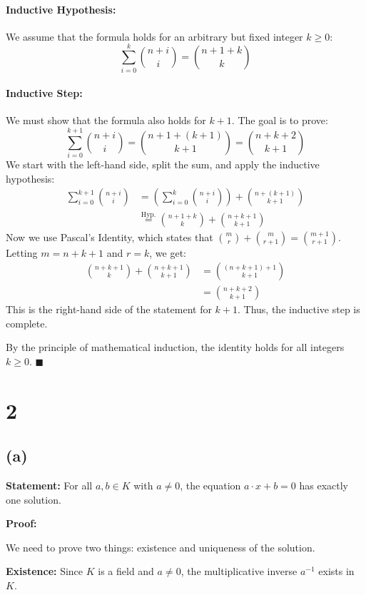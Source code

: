 \documentclass[12pt,a4paper]{article}
\theoremstyle{definition}
\theoremstyle{remark}
\begin{document}
\paragraph{Inductive Hypothesis:} We assume that the formula holds for an arbitrary but fixed integer $k \ge 0$:
\[
\sum_{i=0}^{k} \binom{n+i}{i} = \binom{n+1+k}{k}
\]

\paragraph{Inductive Step:} We must show that the formula also holds for $k+1$. The goal is to prove:
\[
\sum_{i=0}^{k+1} \binom{n+i}{i} = \binom{n+1+(k+1)}{k+1} = \binom{n+k+2}{k+1}
\]
We start with the left-hand side, split the sum, and apply the inductive hypothesis:
\begin{align*}
\sum_{i=0}^{k+1} \binom{n+i}{i} &= \left( \sum_{i=0}^{k} \binom{n+i}{i} \right) + \binom{n+(k+1)}{k+1} \\
&\overset{\text{Hyp.}}{=} \binom{n+1+k}{k} + \binom{n+k+1}{k+1}
\end{align*}
Now we use Pascal's Identity, which states that $\binom{m}{r} + \binom{m}{r+1} = \binom{m+1}{r+1}$.
Letting $m=n+k+1$ and $r=k$, we get:
\begin{align*}
\binom{n+k+1}{k} + \binom{n+k+1}{k+1} &= \binom{(n+k+1)+1}{k+1} \\
&= \binom{n+k+2}{k+1}
\end{align*}
This is the right-hand side of the statement for $k+1$. Thus, the inductive step is complete.

By the principle of mathematical induction, the identity holds for all integers $k \ge 0$. $\blacksquare$

\section*{2}
\subsection*{(a)}

\textbf{Statement:} For all $a, b \in K$ with $a \neq 0$, the equation $a \cdot x + b = 0$ has exactly one solution.

\textbf{Proof:}

We need to prove two things: existence and uniqueness of the solution.

\textbf{Existence:}
Since $K$ is a field and $a \neq 0$, the multiplicative inverse $a^{-1}$ exists in $K$.
\end{document}

